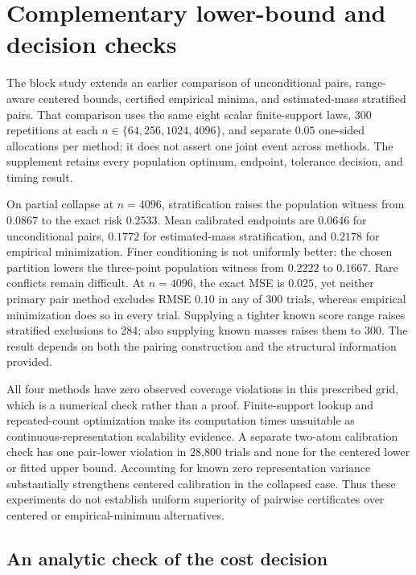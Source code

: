 \section{Complementary lower-bound and decision checks}
\label{sec:witness-comparison}

The block study extends an earlier comparison of unconditional pairs,
range-aware centered bounds, certified empirical minima, and estimated-mass
stratified pairs. That comparison uses the same eight scalar finite-support
laws, 300 repetitions at each $n\in\{64,256,1024,4096\}$, and separate
$0.05$ one-sided allocations per method; it does not assert one joint event
across methods. The supplement retains every population optimum, endpoint,
tolerance decision, and timing result.

On partial collapse at $n=4096$, stratification raises the population witness
from $0.0867$ to the exact risk $0.2533$. Mean calibrated endpoints are
$0.0646$ for unconditional pairs, $0.1772$ for estimated-mass stratification,
and $0.2178$ for empirical minimization. Finer conditioning is not uniformly
better: the chosen partition lowers the three-point population witness from
$0.2222$ to $0.1667$. Rare conflicts remain difficult. At $n=4096$, the
exact MSE is $0.025$, yet neither primary pair method excludes RMSE $0.10$
in any of 300 trials, whereas empirical minimization does so in every trial.
Supplying a tighter known score range raises stratified exclusions to 284;
also supplying known masses raises them to 300. The result depends on both
the pairing construction and the structural information provided.

All four methods have zero observed coverage violations in this prescribed
grid, which is a numerical check rather than a proof. Finite-support lookup
and repeated-count optimization make its computation times unsuitable as
continuous-representation scalability evidence. A separate two-atom
calibration check has one pair-lower violation in 28,800 trials and none for
the centered lower or fitted upper bound. Accounting for known zero
representation variance substantially strengthens centered calibration in
the collapsed case. Thus these experiments do not establish uniform
superiority of pairwise certificates over centered or empirical-minimum
alternatives.

\subsection{An analytic check of the cost decision}
\label{sec:decision-value}

